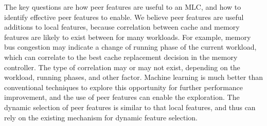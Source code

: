 The key questions are how peer features are useful to an MLC, and how to
identify effective peer features to enable.  We believe peer features are useful
additions to local features, because correlation between cache and memory
features are likely to exist between for many workloads.  For example, memory
bus congestion may indicate a change of running phase of the current workload,
which can correlate to the best cache replacement decision in the memory
controller.  The type of correlation may or may not exist, depending on the
workload, running phases, and other factor.  Machine learning is much better
than conventional techniques to explore this opportunity for further performance
improvement, and the use of peer features can enable the exploration.  The
dynamic selection of peer features is similar to that local features, and thus
can rely on the existing mechanism for dynamic feature selection.

%
